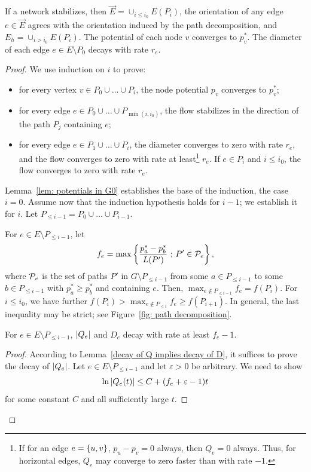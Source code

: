 \documentclass[11pt,a4paper]{article}
\newcommand{\Eorient}{\overrightarrow{E}} \newcommand{\CB}{\mathit{F}}
\begin{document}



\begin{theorem}\label{thm: convergence for stable networks} If a network stabilizes, then $\Eorient = \cup_{i \le i_0} E(P_i)$,
the orientation of any edge $e \in \Eorient$ agrees with the orientation 
induced by the path decomposition, and $E_h = \cup_{i > i_0} E(P_i)$. 
The potential of each node $v$ converges to $p^*_v$. The diameter of each edge $e
\in E \setminus P_0$ decays with rate $r_e$. \end{theorem}
\begin{proof} 
We use induction on $i$ to prove:
\begin{itemize}
\item[-] for every vertex $v \in P_0 \cup \ldots \cup P_i$, the node potential $p_v$ converges to
$p^*_v$;
\item[-] for every edge $e \in P_0 \cup \ldots \cup P_{\min(i,i_0)}$, the flow stabilizes in
the direction of the path $P_j$ containing $e$;
\item[-] for every edge $e \in P_1 \cup \ldots \cup P_i$, the diameter
converges to zero with rate $r_e$, and the flow converges to zero with rate at
least\footnote{If for an edge $e = \{ u,v \}$, $p_u - p_v =0$ always, then
$Q_e = 0$ always. Thus, for horizontal edges, $Q_e$ may converge to zero faster
than with rate $-1$.} $r_e$. If $e \in P_i$ and $i \le i_0$, the flow converges to zero with
rate $r_e$. 
\end{itemize}

Lemma~\ref{lem: potentials in G0} establishes the base of the induction, the
case $i = 0$. Assume now that the induction hypothesis holds for $i - 1$; we
establish it for $i$. Let $P_{\le i-1} = P_0 \cup \ldots \cup P_{i-1}$. 

For $e \in E \setminus P_{\le i-1}$, let 
\[         f_e = \max \left\{ \frac{p^*_a - p^*_b}{L(P')} \mbox{ ; }  P' \in {\cal P}_e \right\}, \]
where ${\cal P}_e$ is the set of paths $P'$ in
$G \setminus P_{\le i-1}$ from some $a \in P_{\le i-1}$ to some $b \in P_{\le
i-1}$ with $p^*_a \ge p^*_b$ and containing $e$.
Then, $\max_{e \not\in P_{\le i-1}} f_e = f(P_i)$. For $i \le i_0$, we have
further $f(P_i) >  \max_{e \not\in P_{\le i}}
f_e \ge f(P_{i+1})$. In general, the last inequality may be strict; see
Figure~\ref{fig: path decomposition}. 



\begin{lemma} For $e \in E \setminus P_{\le i-1}$, $| Q_e |$ and $D_e$ decay with rate at least $f_e
- 1$. 
\end{lemma}
\begin{proof} According to Lemma~\ref{decay of Q implies decay of D}, it
suffices to prove the decay of $| Q_e |$. Let $e \in
E \setminus P_{\le i - 1}$ and let $\varepsilon > 0$ be arbitrary. 
We need to show 
\[               \ln | Q_e(t) | \le C + (f_e + \varepsilon -1)t \]
for some constant $C$ and all sufficiently large $t$. 


\end{proof}
\end{proof}
\end{document}

